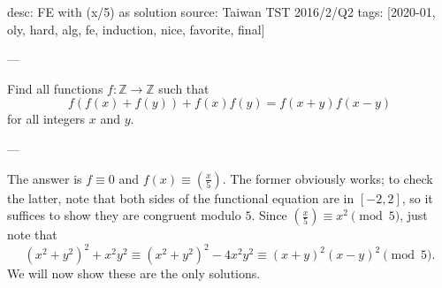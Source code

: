 desc: FE with (x/5) as solution
source: Taiwan TST 2016/2/Q2
tags: [2020-01, oly, hard, alg, fe, induction, nice, favorite, final]

---

Find all functions $f:\mathbb Z\to\mathbb Z$ such that \[f(f(x)+f(y))+f(x)f(y)=f(x+y)f(x-y)\]
for all integers $x$ and $y$.

---

The answer is $f\equiv0$ and $f(x)\equiv\left(\frac x5\right)$. The former obviously works; to check the latter, note that both sides of the functional equation are in $[-2,2]$, so it suffices to show they are congruent modulo $5$. Since $\left(\frac x5\right)\equiv x^2\pmod5$, just note that \[\left(x^2+y^2\right)^2+x^2y^2\equiv\left(x^2+y^2\right)^2-4x^2y^2\equiv(x+y)^2(x-y)^2\pmod5.\]
We will now show these are the only solutions.

